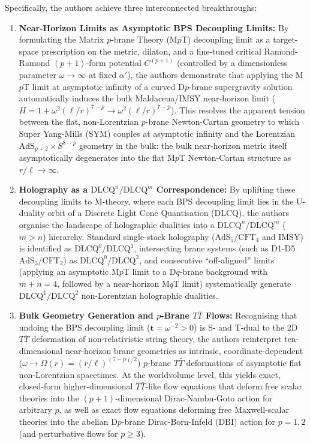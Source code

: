 \documentclass[11pt,a4paper]{article}
\begin{document}
Specifically, the authors achieve three interconnected breakthroughs:
\begin{enumerate}
    \item \textbf{Near-Horizon Limits as Asymptotic BPS Decoupling Limits:} By formulating the Matrix $p$-brane Theory (M$p$T) decoupling limit as a target-space prescription on the metric, dilaton, and a fine-tuned critical Ramond-Ramond $(p+1)$-form potential $C^{(p+1)}$ (controlled by a dimensionless parameter $\omega \to \infty$ at fixed $\alpha'$), the authors demonstrate that applying the M$p$T limit at asymptotic infinity of a curved D$p$-brane supergravity solution automatically induces the bulk Maldacena/IMSY near-horizon limit ($H = 1 + \omega^2 (\ell/r)^{7-p} \to \omega^2 (\ell/r)^{7-p}$). This resolves the apparent tension between the flat, non-Lorentzian $p$-brane Newton-Cartan geometry to which Super Yang-Mills (SYM) couples at asymptotic infinity and the Lorentzian $\text{AdS}_{p+2} \times S^{8-p}$ geometry in the bulk: the bulk near-horizon metric itself asymptotically degenerates into the flat M$p$T Newton-Cartan structure as $r/\ell \to \infty$.
    
    \item \textbf{Holography as a $\text{DLCQ}^n/\text{DLCQ}^m$ Correspondence:} By uplifting these decoupling limits to M-theory, where each BPS decoupling limit lies in the U-duality orbit of a Discrete Light Cone Quantisation (DLCQ), the authors organise the landscape of holographic dualities into a $\text{DLCQ}^n/\text{DLCQ}^m$ ($m > n$) hierarchy. Standard single-stack holography ($\text{AdS}_5/\text{CFT}_4$ and IMSY) is identified as $\text{DLCQ}^0/\text{DLCQ}^1$, intersecting brane systems (such as D1-D5 $\text{AdS}_3/\text{CFT}_2$) as $\text{DLCQ}^0/\text{DLCQ}^2$, and consecutive ``off-aligned'' limits (applying an asymptotic M$p$T limit to a D$q$-brane background with $m+n=4$, followed by a near-horizon M$q$T limit) systematically generate $\text{DLCQ}^1/\text{DLCQ}^2$ non-Lorentzian holographic dualities.
    
    \item \textbf{Bulk Geometry Generation and $p$-Brane $T\bar{T}$ Flows:} Recognising that undoing the BPS decoupling limit ($\boldsymbol{t} = \omega^{-2} > 0$) is S- and T-dual to the 2D $T\bar{T}$ deformation of non-relativistic string theory, the authors reinterpret ten-dimensional near-horizon brane geometries as intrinsic, coordinate-dependent ($\omega \to \Omega(r) = (r/\ell)^{(7-p)/2}$) $p$-brane $T\bar{T}$ deformations of asymptotic flat non-Lorentzian spacetimes. At the worldvolume level, this yields exact, closed-form higher-dimensional $T\bar{T}$-like flow equations that deform free scalar theories into the $(p+1)$-dimensional Dirac-Nambu-Goto action for arbitrary $p$, as well as exact flow equations deforming free Maxwell-scalar theories into the abelian D$p$-brane Dirac-Born-Infeld (DBI) action for $p=1,2$ (and perturbative flows for $p \ge 3$).
\end{enumerate}
\end{document}
